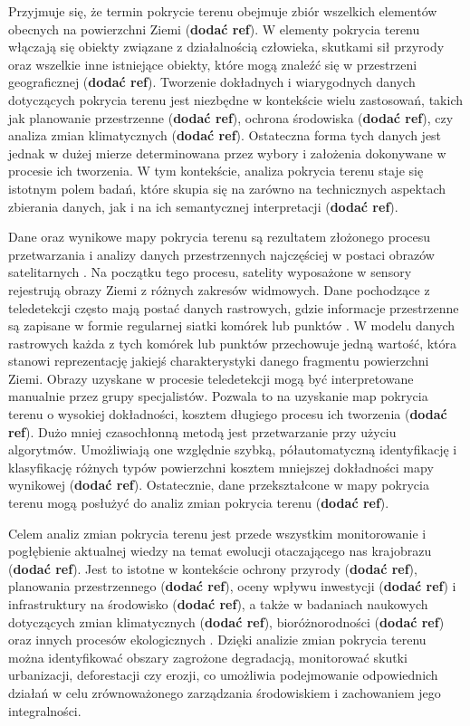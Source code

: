 \documentclass{amuthesis}
\begin{document}
Przyjmuje się, że termin pokrycie terenu obejmuje zbiór wszelkich
elementów obecnych na powierzchni Ziemi (\textbf{dodać ref}). W elementy
pokrycia terenu włączają się obiekty związane z działalnością człowieka,
skutkami sił przyrody oraz wszelkie inne istniejące obiekty, które mogą
znaleźć się w przestrzeni geograficznej (\textbf{dodać ref}). Tworzenie
dokładnych i wiarygodnych danych dotyczących pokrycia terenu jest
niezbędne w kontekście wielu zastosowań, takich jak planowanie
przestrzenne (\textbf{dodać ref}), ochrona środowiska (\textbf{dodać
ref}), czy analiza zmian klimatycznych (\textbf{dodać ref}). Ostateczna
forma tych danych jest jednak w dużej mierze determinowana przez wybory
i założenia dokonywane w procesie ich tworzenia. W tym kontekście,
analiza pokrycia terenu staje się istotnym polem badań, które skupia się
na zarówno na technicznych aspektach zbierania danych, jak i na ich
semantycznej interpretacji (\textbf{dodać ref}).

Dane oraz wynikowe mapy pokrycia terenu są rezultatem złożonego procesu
przetwarzania i analizy danych przestrzennych najczęściej w postaci
obrazów satelitarnych \autocite{Jasiewicz_GeoPAT}. Na początku tego
procesu, satelity wyposażone w sensory rejestrują obrazy Ziemi z różnych
zakresów widmowych. Dane pochodzące z teledetekcji często mają postać
danych rastrowych, gdzie informacje przestrzenne są zapisane w formie
regularnej siatki komórek lub punktów \autocite{glazewski2006modele}. W
modelu danych rastrowych każda z tych komórek lub punktów przechowuje
jedną wartość, która stanowi reprezentację jakiejś charakterystyki
danego fragmentu powierzchni Ziemi. Obrazy uzyskane w procesie
teledetekcji mogą być interpretowane manualnie przez grupy specjalistów.
Pozwala to na uzyskanie map pokrycia terenu o wysokiej dokładności,
kosztem długiego procesu ich tworzenia (\textbf{dodać ref}). Dużo mniej
czasochłonną metodą jest przetwarzanie przy użyciu algorytmów.
Umożliwiają one względnie szybką, półautomatyczną identyfikację i
klasyfikację różnych typów powierzchni kosztem mniejszej dokładności
mapy wynikowej (\textbf{dodać ref}). Ostatecznie, dane przekształcone w
mapy pokrycia terenu mogą posłużyć do analiz zmian pokrycia terenu
(\textbf{dodać ref}).

Celem analiz zmian pokrycia terenu jest przede wszystkim monitorowanie i
pogłębienie aktualnej wiedzy na temat ewolucji otaczającego nas
krajobrazu (\textbf{dodać ref}). Jest to istotne w kontekście ochrony
przyrody (\textbf{dodać ref}), planowania przestrzennego (\textbf{dodać
ref}), oceny wpływu inwestycji (\textbf{dodać ref}) i infrastruktury na
środowisko (\textbf{dodać ref}), a także w badaniach naukowych
dotyczących zmian klimatycznych (\textbf{dodać ref}), bioróżnorodności
(\textbf{dodać ref}) oraz innych procesów ekologicznych
\autocite{ChangeDetectionTechniques}. Dzięki analizie zmian pokrycia
terenu można identyfikować obszary zagrożone degradacją, monitorować
skutki urbanizacji, deforestacji czy erozji, co umożliwia podejmowanie
odpowiednich działań w celu zrównoważonego zarządzania środowiskiem i
zachowaniem jego integralności.
\end{document}
